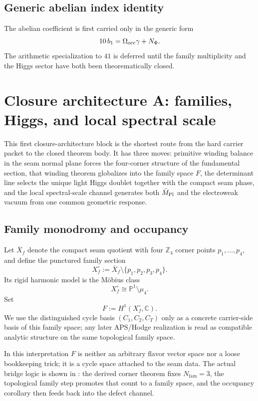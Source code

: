 \subsection{Generic abelian index identity}

The abelian coefficient is first carried only in the generic form
\begin{equation}
\label{eq:41-chain-main}
10\,b_1
=
\Omega_{\mathrm{occ}}\gamma+N_\Phi.
\end{equation}
The arithmetic specialization to $41$ is deferred until the family multiplicity and the Higgs
sector have both been theorematically closed.


\section{Closure architecture A: families, Higgs, and local spectral scale}

This first closure-architecture block is the shortest route from the hard carrier packet to the
closed theorem body. It has three moves: primitive winding balance in the seam normal plane forces
the four-corner structure of the fundamental section, that winding theorem globalizes into the
family space $F$, the determinant line selects the unique light Higgs doublet together with the
compact seam phase, and the local spectral-scale channel generates both $\bar M_{\mathrm{Pl}}$ and the electroweak
vacuum from one common geometric response.

\subsection{Family monodromy and occupancy}

\begin{definition}
Let $\overline X_f$ denote the compact seam quotient with four $\mathbb Z_4$ corner points
$p_1,\dots,p_4$, and define the punctured family section
\[
X_f^\circ:=\overline X_f\setminus\{p_1,p_2,p_3,p_4\}.
\]
Its rigid harmonic model is the Möbius class
\[
X_f^\circ\cong \mathbb P^1\setminus\mu_4.
\]
Set
\[
F:=H^1(X_f^\circ,\mathbb C).
\]
We use the distinguished cycle basis $(C_1,C_2,C_T)$ only as a concrete carrier-side basis of this family space; any later APS/Hodge realization is read as compatible analytic structure on the same topological family space.
\end{definition}
In this interpretation $F$ is neither an arbitrary flavor vector space nor a loose bookkeeping
trick; it is a cycle space attached to the seam data. The actual bridge logic is shown in
: the derived corner theorem fixes $N_{\mathrm{fam}}=3$, the
topological family step promotes that count to a family space, and the occupancy corollary then
feeds back into the defect channel.

